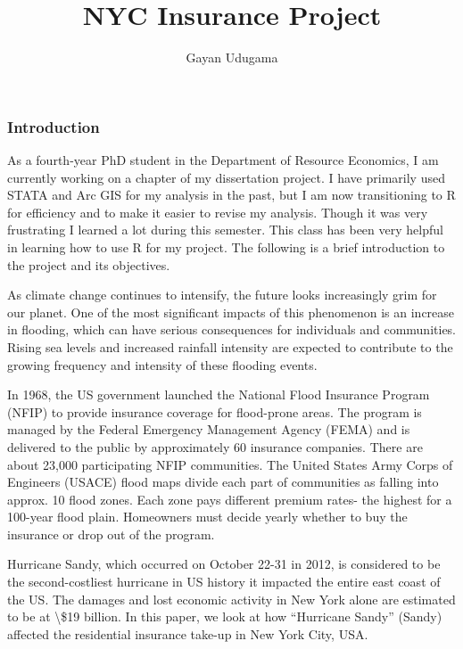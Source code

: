 \documentclass[
  letterpaper,
  DIV=11,
  numbers=noendperiod]{scrartcl}
\title{NYC Insurance Project}
\author{Gayan Udugama}
\date{}
\renewcommand*\contentsname{Table of contents}
\newcommand\contentsname{Table of contents}
\begin{document}
\maketitle
\ifdefined\Shaded\renewenvironment{Shaded}{\begin{tcolorbox}[boxrule=0pt, frame hidden, sharp corners, enhanced, breakable, borderline west={3pt}{0pt}{shadecolor}, interior hidden]}{\end{tcolorbox}}\fi

\renewcommand*\contentsname{Table of contents}
{
\hypersetup{linkcolor=}
\setcounter{tocdepth}{3}
\tableofcontents
}
\hypertarget{introduction}{%
\subsubsection{Introduction}\label{introduction}}

As a fourth-year PhD student in the Department of Resource Economics, I
am currently working on a chapter of my dissertation project. I have
primarily used STATA and Arc GIS for my analysis in the past, but I am
now transitioning to R for efficiency and to make it easier to revise my
analysis. Though it was very frustrating I learned a lot during this
semester. This class has been very helpful in learning how to use R for
my project. The following is a brief introduction to the project and its
objectives.

As climate change continues to intensify, the future looks increasingly
grim for our planet. One of the most significant impacts of this
phenomenon is an increase in flooding, which can have serious
consequences for individuals and communities. Rising sea levels and
increased rainfall intensity are expected to contribute to the growing
frequency and intensity of these flooding events.

In 1968, the US government launched the National Flood Insurance Program
(NFIP) to provide insurance coverage for flood-prone areas. The program
is managed by the Federal Emergency Management Agency (FEMA) and is
delivered to the public by approximately 60 insurance companies. There
are about 23,000 participating NFIP communities. The United States Army
Corps of Engineers (USACE) flood maps divide each part of communities as
falling into approx. 10 flood zones. Each zone pays different premium
rates- the highest for a 100-year flood plain. Homeowners must decide
yearly whether to buy the insurance or drop out of the program.

Hurricane Sandy, which occurred on October 22-31 in 2012, is considered
to be the second-costliest hurricane in US history it impacted the
entire east coast of the US. The damages and lost economic activity in
New York alone are estimated to be at \textbackslash\$19 billion. In
this paper, we look at how ``Hurricane Sandy'' (Sandy) affected the
residential insurance take-up in New York City, USA.
\end{document}
